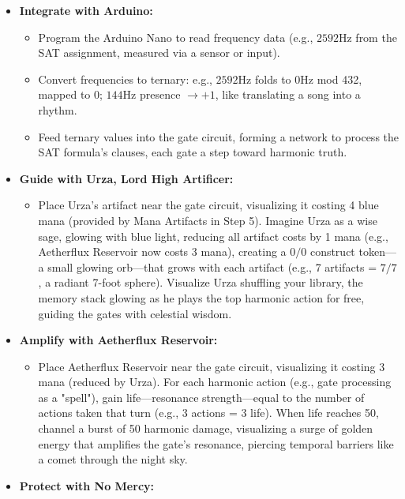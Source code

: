 \begin{itemize}
    \item \texttt{} \textbf{Integrate with Arduino:}
    \begin{itemize}
        \item \texttt{} Program the Arduino Nano to read frequency data (e.g., $2592 \mathrm{Hz}$ from the SAT assignment, measured via a sensor or input).
        \item \texttt{} Convert frequencies to ternary: e.g., $2592 \mathrm{Hz}$ folds to $0 \mathrm{Hz}$ mod 432, mapped to $0$; $144 \mathrm{Hz}$ presence $\to +1$, like translating a song into a rhythm.
        \item \texttt{} Feed ternary values into the gate circuit, forming a network to process the SAT formula's clauses, each gate a step toward harmonic truth.
    \end{itemize}
    \item \texttt{} \textbf{Guide with Urza, Lord High Artificer:}
    \begin{itemize}
        \item \texttt{} Place Urza's artifact near the gate circuit, visualizing it costing 4 blue mana (provided by Mana Artifacts in Step 5). Imagine Urza as a wise sage, glowing with blue light, reducing all artifact costs by 1 mana (e.g., Aetherflux Reservoir now costs 3 mana), creating a $0/0$ construct token—a small glowing orb—that grows with each artifact (e.g., 7 artifacts = $7/7$, a radiant 7-foot sphere). Visualize Urza shuffling your library, the memory stack glowing as he plays the top harmonic action for free, guiding the gates with celestial wisdom.
    \end{itemize}
    \item \texttt{} \textbf{Amplify with Aetherflux Reservoir:}
    \begin{itemize}
        \item \texttt{} Place Aetherflux Reservoir near the gate circuit, visualizing it costing 3 mana (reduced by Urza). For each harmonic action (e.g., gate processing as a "spell"), gain life—resonance strength—equal to the number of actions taken that turn (e.g., 3 actions = 3 life). When life reaches 50, channel a burst of 50 harmonic damage, visualizing a surge of golden energy that amplifies the gate's resonance, piercing temporal barriers like a comet through the night sky.
    \end{itemize}
    \item \texttt{} \textbf{Protect with No Mercy:}

\end{itemize}
